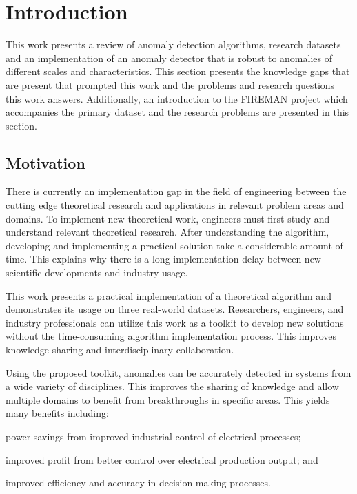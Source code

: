 \section{Introduction}
\label{ref_intro}

This work presents a review of anomaly detection algorithms, research datasets and an implementation of an anomaly detector that is robust to anomalies of different scales and characteristics. This section presents the knowledge gaps that are present that prompted this work and the problems and research questions this work answers. Additionally, an introduction to the FIREMAN project which accompanies the primary dataset and the research problems are presented in this section.

\subsection{Motivation}

There is currently an implementation gap in the field of engineering between the cutting edge theoretical research and applications in relevant problem areas and domains. To implement new theoretical work, engineers must first study and understand relevant theoretical research. After understanding the algorithm, developing and implementing a practical solution take a  considerable amount of time. This explains why there is a long implementation delay between new scientific developments and industry usage. 

This work presents a practical implementation of a theoretical algorithm and demonstrates its usage on three real-world datasets. Researchers, engineers, and industry professionals can utilize this work as a toolkit to develop new solutions without the time-consuming algorithm implementation process. This improves knowledge sharing and interdisciplinary collaboration.

Using the proposed toolkit, anomalies can be accurately detected in systems from a wide variety of disciplines. This improves the sharing of knowledge and allow multiple domains to benefit from breakthroughs in specific areas. This yields many benefits including:
\begin{inlinelist}
  \item power savings from improved industrial control of electrical processes;
  \item improved profit from better control over electrical production output; and
  \item improved efficiency and accuracy in decision making processes.
\end{inlinelist}

